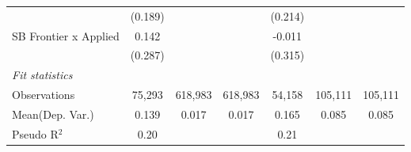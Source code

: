 \begin{tabular}{lcccccc}
                         & (0.189)        &         &         & (0.214)        &         &   \\   
   SB Frontier x Applied & 0.142          &         &         & -0.011         &         &   \\   
                         & (0.287)        &         &         & (0.315)        &         &   \\   
   \midrule
   \emph{Fit statistics}\\
   Observations          & 75,293         & 618,983 & 618,983 & 54,158         & 105,111 & 105,111\\  
Mean(Dep. Var.) & 0.139 & 0.017 & 0.017 & 0.165 & 0.085 & 0.085 \\
   Pseudo R$^2$          & 0.20           &         &         & 0.21           &         & \\  
   

\end{tabular}

